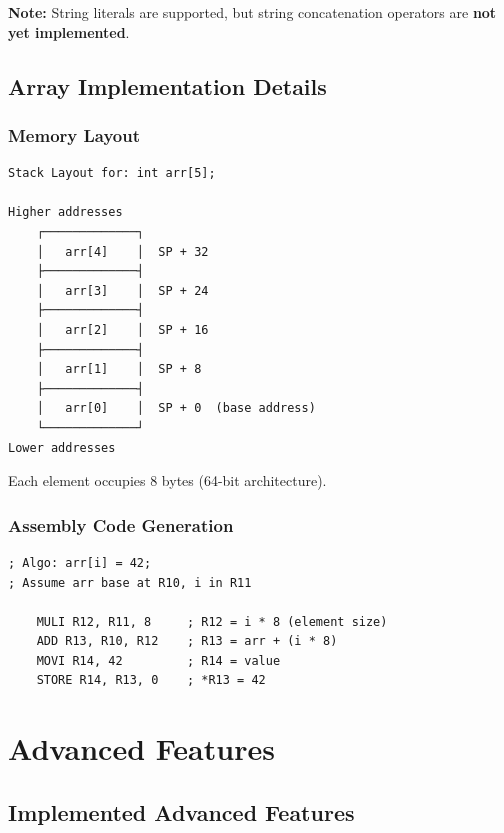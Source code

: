 \documentclass[12pt,a4paper,oneside]{book}
\begin{document}
\textbf{Note:} String literals are supported, but string concatenation operators are \textbf{not yet implemented}.

\section{Array Implementation Details}

\subsection{Memory Layout}

\begin{verbatim}
Stack Layout for: int arr[5];

Higher addresses
    ┌─────────────┐
    │   arr[4]    │  SP + 32
    ├─────────────┤
    │   arr[3]    │  SP + 24
    ├─────────────┤
    │   arr[2]    │  SP + 16
    ├─────────────┤
    │   arr[1]    │  SP + 8
    ├─────────────┤
    │   arr[0]    │  SP + 0  (base address)
    └─────────────┘
Lower addresses
\end{verbatim}

Each element occupies 8 bytes (64-bit architecture).

\subsection{Assembly Code Generation}

\begin{lstlisting}[style=assembly, caption={Generated Assembly for Array Access}]
; Algo: arr[i] = 42;
; Assume arr base at R10, i in R11

    MULI R12, R11, 8     ; R12 = i * 8 (element size)
    ADD R13, R10, R12    ; R13 = arr + (i * 8)
    MOVI R14, 42         ; R14 = value
    STORE R14, R13, 0    ; *R13 = 42
\end{lstlisting}

\chapter{Advanced Features}

\section{Implemented Advanced Features}
\end{document}
